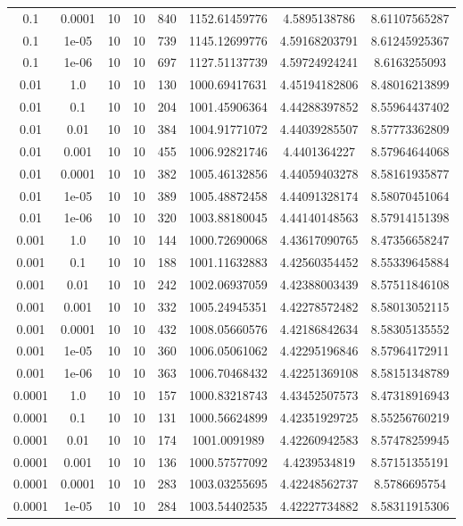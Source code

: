 \documentclass[11pt,a4paper]{article}
\begin{document}
\begin{table}
{\begin{tabular}{*{8}c}
 0.1 & 0.0001 &10 &10 & 840& 1152.61459776 & 4.5895138786 & 8.61107565287 \\
 0.1 & 1e-05 &10 &10 & 739& 1145.12699776 & 4.59168203791 & 8.61245925367 \\
 0.1 & 1e-06 &10 &10 & 697& 1127.51137739 & 4.59724924241 & 8.6163255093 \\
 0.01 & 1.0 &10 &10 & 130& 1000.69417631 & 4.45194182806 & 8.48016213899 \\
 0.01 & 0.1 &10 &10 & 204& 1001.45906364 & 4.44288397852 & 8.55964437402 \\
 0.01 & 0.01 &10 &10 & 384& 1004.91771072 & 4.44039285507 & 8.57773362809 \\
 0.01 & 0.001 &10 &10 & 455& 1006.92821746 & 4.4401364227 & 8.57964644068 \\
 0.01 & 0.0001 &10 &10 & 382& 1005.46132856 & 4.44059403278 & 8.58161935877 \\
 0.01 & 1e-05 &10 &10 & 389& 1005.48872458 & 4.44091328174 & 8.58070451064 \\
 0.01 & 1e-06 &10 &10 & 320& 1003.88180045 & 4.44140148563 & 8.57914151398 \\
 0.001 & 1.0 &10 &10 & 144& 1000.72690068 & 4.43617090765 & 8.47356658247 \\
 0.001 & 0.1 &10 &10 & 188& 1001.11632883 & 4.42560354452 & 8.55339645884 \\
 0.001 & 0.01 &10 &10 & 242& 1002.06937059 & 4.42388003439 & 8.57511846108 \\
 0.001 & 0.001 &10 &10 & 332& 1005.24945351 & 4.42278572482 & 8.58013052115 \\
 0.001 & 0.0001 &10 &10 & 432& 1008.05660576 & 4.42186842634 & 8.58305135552 \\
 0.001 & 1e-05 &10 &10 & 360& 1006.05061062 & 4.42295196846 & 8.57964172911 \\
 0.001 & 1e-06 &10 &10 & 363& 1006.70468432 & 4.42251369108 & 8.58151348789 \\
 0.0001 & 1.0 &10 &10 & 157& 1000.83218743 & 4.43452507573 & 8.47318916943 \\
 0.0001 & 0.1 &10 &10 & 131& 1000.56624899 & 4.42351929725 & 8.55256760219 \\
 0.0001 & 0.01 &10 &10 & 174& 1001.0091989 & 4.42260942583 & 8.57478259945 \\
 0.0001 & 0.001 &10 &10 & 136& 1000.57577092 & 4.4239534819 & 8.57151355191 \\
 0.0001 & 0.0001 &10 &10 & 283& 1003.03255695 & 4.42248562737 & 8.5786695754 \\
 0.0001 & 1e-05 &10 &10 & 284& 1003.54402535 & 4.42227734882 & 8.58311915306 \\

\end{tabular}}
\end{table}
\end{document}
